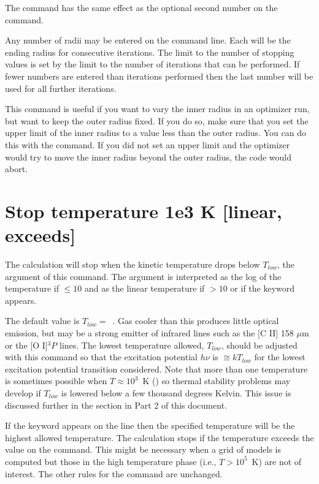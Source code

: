 The  command has the same effect
as the optional second
number on the  command.

Any number of radii may be entered on the command line.
Each will
be the ending radius for consecutive iterations.
The limit to the number
of stopping values is set by the limit to the number of iterations that
can be performed.
If fewer numbers are entered than iterations performed
then the last number will be used for all further iterations.

This command is useful if you want to vary the inner radius in an optimizer
run, but want to keep the outer radius fixed. If you do so, make sure that you
set the upper limit of the inner radius to a value less than the outer radius.
You can do this with the  command. If you did not
set an upper limit and the optimizer would try to move the inner radius beyond
the outer radius, the code would abort.

\section{Stop temperature 1e3 K [linear, exceeds]}
\label{sec:CommandStopTemperature}

The calculation will stop when the kinetic temperature drops below
$T_{low}$, the argument of this command.
The argument is interpreted as the log of
the temperature if $\le 10$ and as the linear temperature
if $> 10$ or if the  keyword appears.

The default value is $T_{low} =$~\TEMPSTOPDEFAULT.
Gas cooler than this produces little
optical emission, but may be a strong emitter of infrared lines such as
the [C II] 158 $\mu$m or the [O I]$^3P$ lines.
The lowest temperature allowed,
$T_{low}$, should be adjusted with this command
so that the excitation potential
$h\nu$ is $\cong kT_{low}$ for the lowest excitation potential
transition considered.
Note that more than one temperature is sometimes possible
when $T \approx 10^3$~K
(\citealp{Williams1967}) so thermal stability problems may develop
if $T_{low}$ is lowered
below a few thousand degrees Kelvin.
This issue is discussed further in
the section  in Part 2 of this document.

If the keyword  appears on the line
then the specified temperature
will be the highest allowed temperature.
The calculation stops if the
temperature exceeds the value on the command.
This might be necessary when
a grid of models is computed but those in the high
temperature phase (i.e.,
$T > 10^5$~K) are not of interest.
The other rules for the command are
unchanged.


